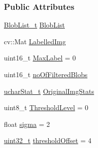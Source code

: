 \subsubsection*{Public Attributes}
\begin{DoxyCompactItemize}
\item 
\hyperlink{class_vision_1_1_segment_a60e08251e2ab94239e245044c31cde51}{Blob\+List\+\_\+t} \hyperlink{class_vision_1_1_segment_a74e0600a7dd49bd7110ee27bb4cd6e0e}{Blob\+List}
\item 
cv\+::\+Mat \hyperlink{class_vision_1_1_segment_a4daa143f6cd4a753d3bbe45c6a67d27f}{Labelled\+Img}
\item 
uint16\+\_\+t \hyperlink{class_vision_1_1_segment_a22d2a688de65f4d25b164f8b2a03f4a9}{Max\+Label} = 0
\item 
uint16\+\_\+t \hyperlink{class_vision_1_1_segment_a97077da3a144e800073bc06f5d4722d4}{no\+Of\+Filtered\+Blobs}
\item 
\hyperlink{_stats_8h_a5b876b087ada3df30b8dd6309fc25191}{uchar\+Stat\+\_\+t} \hyperlink{class_vision_1_1_segment_ab35cfe5504de7e5ea327991468e6cf3b}{Original\+Img\+Stats}
\item 
uint8\+\_\+t \hyperlink{class_vision_1_1_segment_a44f45a7d08ba6fed38e5c31bc9108291}{Threshold\+Level} = 0
\item 
float \hyperlink{class_vision_1_1_segment_a0d2c607a6064d8d8fea925fc7bfbbc53}{sigma} = 2
\item 
\hyperlink{_soil_math_types_8h_a435d1572bf3f880d55459d9805097f62}{uint32\+\_\+t} \hyperlink{class_vision_1_1_segment_a1338fc42ead26c6b1dd661f4281f5674}{threshold\+Offset} = 4
\end{DoxyCompactItemize}
